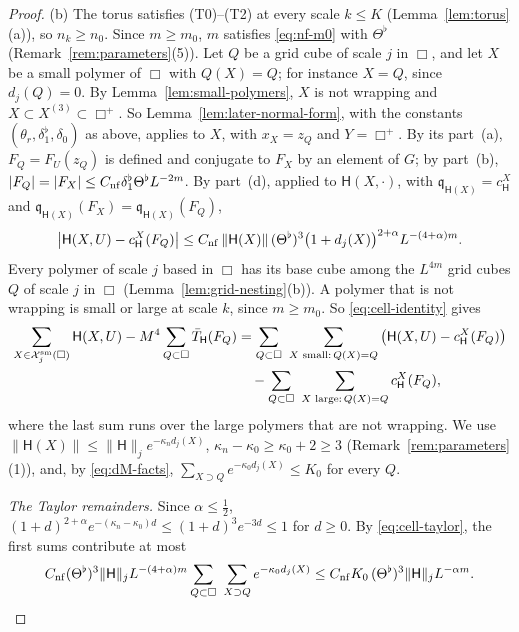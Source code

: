\begin{proof}
(b) The torus satisfies (T0)--(T2) at every scale $k\le K$ (Lemma~\ref{lem:torus}(a)), so $n_k\ge n_0$. Since $m\ge m_0$, $m$ satisfies \eqref{eq:nf-m0} with $\Theta^\flat$ (Remark~\ref{rem:parameters}(5)). Let $Q$ be a grid cube of scale $j$ in $\Box$, and let $X$ be a small polymer of $\Box$ with $Q(X)=Q$; for instance $X=Q$, since $d_j(Q)=0$. By Lemma~\ref{lem:small-polymers}, $X$ is not wrapping and $X\subset X^{(3)}\subset\Box^+$. So Lemma~\ref{lem:later-normal-form}, with the constants $(\theta_r,\delta_1^\flat,\delta_0)$ as above, applies to $X$, with $x_X=z_Q$ and $Y=\Box^+$. By its part~(a), $F_Q=F_U(z_Q)$ is defined and conjugate to $F_X$ by an element of $G$; by part~(b), $|F_Q|=|F_X|\le C_{\rm nf}\delta_1^\flat\Theta^\flat L^{-2m}$. By part~(d), applied to $\mathsf H(X,\cdot)$, with $\mathfrak q_{\mathsf H(X)}=c^X_{\mathsf H}$ and $\mathfrak q_{\mathsf H(X)}(F_X)=\mathfrak q_{\mathsf H(X)}(F_Q)$,
\begin{equation}\label{eq:cell-taylor}
\big|\mathsf H(X,U)-c^X_{\mathsf H}(F_Q)\big|\le C_{\rm nf}\,\|\mathsf H(X)\|\,(\Theta^\flat)^3\big(1+d_j(X)\big)^{2+\alpha}L^{-(4+\alpha)m}.
\end{equation}
Every polymer of scale $j$ based in $\Box$ has its base cube among the $L^{4m}$ grid cubes $Q$ of scale $j$ in $\Box$ (Lemma~\ref{lem:grid-nesting}(b)). A polymer that is not wrapping is small or large at scale $k$, since $m\ge m_0$. So \eqref{eq:cell-identity} gives
\[
\begin{aligned}
\sum_{X\in\mathcal X^{\rm sm}_j(\Box)}\mathsf H(X,U)-M^4\sum_{Q\subset\Box}\bar T_{\mathsf H}(F_Q)
&=\sum_{Q\subset\Box}\ \sum_{X\text{ small}:\,Q(X)=Q}\big(\mathsf H(X,U)-c^X_{\mathsf H}(F_Q)\big)\\
&\quad-\sum_{Q\subset\Box}\ \sum_{X\text{ large}:\,Q(X)=Q}c^X_{\mathsf H}(F_Q),
\end{aligned}
\]
where the last sum runs over the large polymers that are not wrapping. We use $\|\mathsf H(X)\|\le\|\mathsf H\|_je^{-\kappa_nd_j(X)}$, $\kappa_n-\kappa_0\ge\kappa_0+2\ge3$ (Remark~\ref{rem:parameters}(1)), and, by \eqref{eq:dM-facts}, $\sum_{X\supset Q}e^{-\kappa_0d_j(X)}\le K_0$ for every $Q$.

\emph{The Taylor remainders.} Since $\alpha\le\frac12$, $(1+d)^{2+\alpha}e^{-(\kappa_n-\kappa_0)d}\le(1+d)^3e^{-3d}\le1$ for $d\ge0$. By \eqref{eq:cell-taylor}, the first sums contribute at most
\[
C_{\rm nf}(\Theta^\flat)^3\|\mathsf H\|_jL^{-(4+\alpha)m}\sum_{Q\subset\Box}\ \sum_{X\supset Q}e^{-\kappa_0d_j(X)}\le C_{\rm nf}K_0\,(\Theta^\flat)^3\|\mathsf H\|_jL^{-\alpha m}.
\]


\end{proof}
